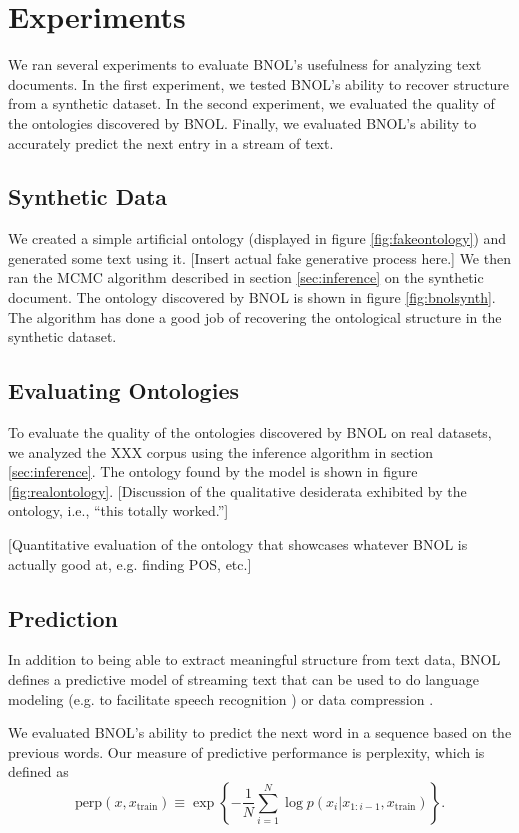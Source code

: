 \documentclass{article}
\newcommand{\perplexity}{\textrm{perp}}
\begin{document}
\section{Experiments}

We ran several experiments to evaluate BNOL's usefulness for analyzing
text documents. In the first experiment, we tested BNOL's ability to
recover structure from a synthetic dataset. In the second experiment,
we evaluated the quality of the ontologies discovered by
BNOL. Finally, we evaluated BNOL's ability to accurately predict the
next entry in a stream of text.

\subsection{Synthetic Data}
We created a simple artificial ontology (displayed in figure
\ref{fig:fakeontology}) and generated some text using it. [Insert
  actual fake generative process here.] We then ran the MCMC algorithm
described in section \ref{sec:inference} on the synthetic document.
The ontology discovered by BNOL is shown in figure
\ref{fig:bnolsynth}. The algorithm has done a good job of recovering
the ontological structure in the synthetic dataset.

\subsection{Evaluating Ontologies}
To evaluate the quality of the ontologies discovered by BNOL on real
datasets, we analyzed the XXX corpus using the inference algorithm in
section \ref{sec:inference}. The ontology found by the model is shown
in figure \ref{fig:realontology}. [Discussion of the qualitative
  desiderata exhibited by the ontology, i.e., ``this totally worked.'']

[Quantitative evaluation of the ontology that showcases whatever BNOL
is actually good at, e.g. finding POS, etc.]

\subsection{Prediction}
In addition to being able to extract meaningful structure from text
data, BNOL defines a predictive model of streaming text that can be
used to do language modeling (e.g. to facilitate speech recognition
\cite{???}) or data compression \cite{???}.

We evaluated BNOL's ability to predict the next word in a sequence
based on the previous words. Our measure of predictive performance
is perplexity, which is defined as
\begin{equation}
\perplexity(x, x_\textrm{train}) \equiv
\exp\left\{-\frac{1}{N}\sum_{i=1}^N\log p(x_i|x_{1:i-1},
x_\textrm{train})\right\}.
\end{equation}
\end{document}
